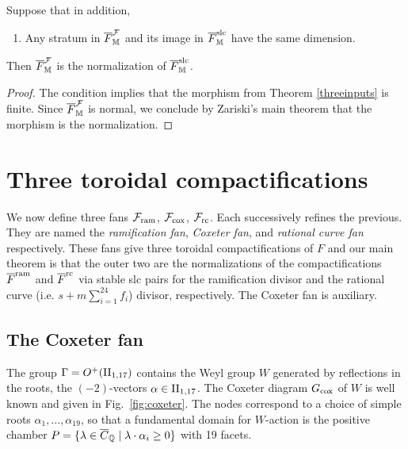 \documentclass[table,x11names]{amsart}
\begin{document}
\begin{corollary}\label{normalization} Suppose that in addition,
\begin{enumerate}
\item[{\bf (dim)}] Any stratum in ${\overline F}_{\mathbb M}^{{\mathcal F}}$ and its image in ${\overline F}_{\mathbb M}^{{\rm slc}}$ have the same dimension.
\end{enumerate}
Then
${\overline F}_{\mathbb M}^{{\mathcal F}}$ is the normalization of ${\overline F}_{\mathbb M}^{{\rm slc}}$. \end{corollary}

\begin{proof} The condition implies that the morphism from Theorem \ref{threeinputs} is finite. Since ${\overline F}_{\mathbb M}^{{\mathcal F}}$ is normal,
we conclude by Zariski's main theorem that the morphism is the normalization. \end{proof}

\section{Three toroidal compactifications}
\label{sec:fans}

We now define three fans ${\mathcal F}_{\rm ram}$,
${\mathcal F}_{\rm cox}$, ${\mathcal F}_{\rm rc}$. Each
successively refines the previous. They are named the
{\it ramification fan}, {\it Coxeter fan}, and {\it rational curve fan}
respectively. These fans give three toroidal
compactifications of $F$ and our main theorem is that
the outer two are the normalizations of the 
compactifications ${\overline F}^{{\rm ram}}$ and ${\overline F}^{{\rm rc}}$
via stable slc pairs for the ramification divisor and
the rational curve (i.e. $s+m\sum_{i=1}^{24} f_i$)
divisor, respectively. The Coxeter fan is auxiliary.

\subsection{The Coxeter fan}
\label{sec:coxeter-fan}

The group $\Gamma=O^+(\IIell)$ contains the Weyl group
$W$ generated by reflections in the
roots, the $(-2)$-vectors $\alpha\in\IIell$. 
The Coxeter diagram $G_{\rm cox}$
of $W$ is well known and given in Fig.~\ref{fig:coxeter}. The nodes
correspond to a choice of simple roots $\alpha_1, \dotsc, \alpha_{19}$, so
that a fundamental domain for $W$-action is the positive chamber
\begin{math}
  P=\{\lambda\in {\overline C}_{\mathbb Q}\mid \lambda\cdot \alpha_i \ge0\}
\end{math}
with 19 facets.
\end{document}
